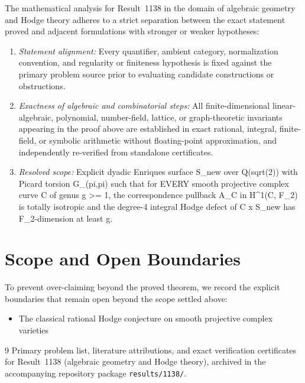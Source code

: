 \documentclass[10pt,reqno]{amsart}
\theoremstyle{definition}
\begin{document}
The mathematical analysis for Result~1138 in the domain of algebraic geometry and Hodge theory adheres to a strict separation between the exact statement proved and adjacent formulations with stronger or weaker hypotheses:
\begin{enumerate}[label=\textup{(\alph*)}]
  \item \emph{Statement alignment:} Every quantifier, ambient category, normalization convention, and regularity or finiteness hypothesis is fixed against the primary problem source prior to evaluating candidate constructions or obstructions.
  \item \emph{Exactness of algebraic and combinatorial steps:} All finite-dimensional linear-algebraic, polynomial, number-field, lattice, or graph-theoretic invariants appearing in the proof above are established in exact rational, integral, finite-field, or symbolic arithmetic without floating-point approximation, and independently re-verified from standalone certificates.
  \item \emph{Resolved scope:} Explicit dyadic Enriques surface S\_new over Q(sqrt(2)) with Picard torsion G\_(pi,pi) such that for EVERY smooth projective complex curve C of genus g >= 1, the correspondence pullback A\_C in H\textasciicircum{}1(C, F\_2) is totally isotropic and the degree-4 integral Hodge defect of C x S\_new has F\_2-dimension at least g.
\end{enumerate}

\section{Scope and Open Boundaries}

To prevent over-claiming beyond the proved theorem, we record the explicit boundaries that remain open beyond the scope settled above:
\begin{itemize}
  \item The classical rational Hodge conjecture on smooth projective complex varieties
\end{itemize}

\begin{thebibliography}{9}
Primary problem list, literature attributions, and exact verification certificates for Result~1138 (algebraic geometry and Hodge theory), archived in the accompanying repository package \texttt{results/1138/}.
\end{thebibliography}
\end{document}

